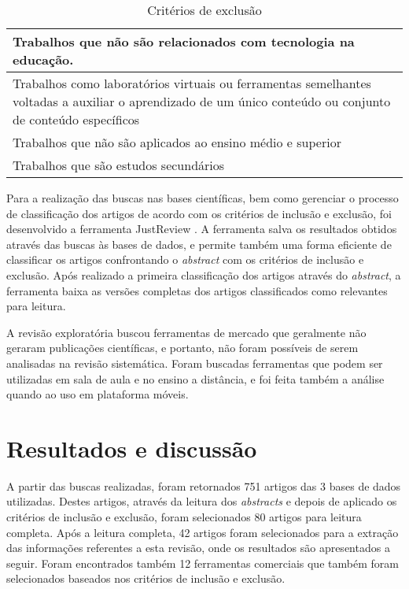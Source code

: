 \bgroup
\def\arraystretch{1.5} %
\begin{table}[h]{} %
\centering
\begin{tabular}{ | p{14cm}| } \hline
Trabalhos que não são relacionados com tecnologia na educação. \\ \hline
Trabalhos como laboratórios virtuais ou ferramentas semelhantes voltadas a auxiliar o aprendizado de um único conteúdo ou conjunto de conteúdo específicos \\ \hline
Trabalhos que não são aplicados ao ensino médio e superior \\ \hline
Trabalhos que são estudos secundários \\ \hline
\end{tabular}
\caption{Critérios de exclusão}
\label{tab:criteriosExclusao}
\end{table}
\egroup

Para a realização das buscas nas bases científicas, bem como gerenciar o processo de classificação dos artigos de acordo com os critérios de inclusão e exclusão, foi desenvolvido a ferramenta JustReview \cite{tulio:2013}. A ferramenta salva os resultados obtidos através das buscas às bases de dados, e permite também uma forma eficiente de classificar os artigos confrontando o \emph{abstract} com os critérios de inclusão e exclusão. Após realizado a primeira classificação dos artigos através do \emph{abstract}, a ferramenta baixa as versões completas dos artigos classificados como relevantes para leitura.

A revisão exploratória buscou ferramentas de mercado que geralmente não geraram publicações científicas, e portanto, não foram possíveis de serem analisadas na revisão sistemática. Foram buscadas ferramentas que podem ser utilizadas em sala de aula e no ensino a distância, e foi feita também a análise quando ao uso em plataforma móveis.

\section{Resultados e discussão}
A partir das buscas realizadas, foram retornados 751 artigos das 3 bases de dados utilizadas. Destes artigos, através da leitura dos \emph{abstracts} e depois de aplicado os critérios de inclusão e exclusão, foram selecionados 80 artigos para leitura completa. Após a leitura completa, 42 artigos foram selecionados para a extração das informações referentes a esta revisão, onde os resultados são apresentados a seguir. Foram encontrados também 12 ferramentas comerciais que também foram selecionados baseados nos critérios de inclusão e exclusão.

